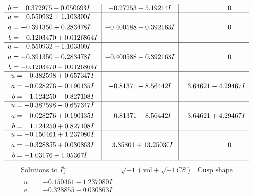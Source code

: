 \documentclass[1p]{elsarticle_modified}
\theoremstyle{definition}
\newcommand{\I}{\sqrt{-1}}
\begin{document}
$$\begin{array}{c|c|c}
\begin{aligned}
b &= \phantom{-}0.372975 - 0.050693 I\end{aligned}
 & -0.27253 + 5.19214 I & \phantom{-0.000000 } 0 \\ \hline\begin{aligned}
u &= \phantom{-}0.550932 + 1.103300 I \\
a &= -0.391350 + 0.283478 I \\
b &= -0.1203470 + 0.0126864 I\end{aligned}
 & -0.400588 + 0.392163 I & \phantom{-0.000000 } 0 \\ \hline\begin{aligned}
u &= \phantom{-}0.550932 - 1.103300 I \\
a &= -0.391350 - 0.283478 I \\
b &= -0.1203470 - 0.0126864 I\end{aligned}
 & -0.400588 - 0.392163 I & \phantom{-0.000000 } 0 \\ \hline\begin{aligned}
u &= -0.382598 + 0.657347 I \\
a &= -0.028276 - 0.190135 I \\
b &= \phantom{-}1.124250 - 0.827108 I\end{aligned}
 & -0.81371 + 8.56442 I & \phantom{-}3.64621 - 4.29467 I \\ \hline\begin{aligned}
u &= -0.382598 - 0.657347 I \\
a &= -0.028276 + 0.190135 I \\
b &= \phantom{-}1.124250 + 0.827108 I\end{aligned}
 & -0.81371 - 8.56442 I & \phantom{-}3.64621 + 4.29467 I \\ \hline\begin{aligned}
u &= -0.150461 + 1.237080 I \\
a &= -0.328855 + 0.030863 I \\
b &= -1.03176 + 1.05367 I\end{aligned}
 & \phantom{-}3.35801 + 13.25030 I & \phantom{-0.000000 } 0\\
 \hline 
 \end{array}$$\newpage$$\begin{array}{c|c|c}  
\text{Solutions to }I^u_{1}& \I (\text{vol} + \sqrt{-1}CS) & \text{Cusp shape}\\
 \hline 
\begin{aligned}
u &= -0.150461 - 1.237080 I \\
a &= -0.328855 - 0.030863 I \\

\end{aligned}
\end{array}$$
\end{document}

